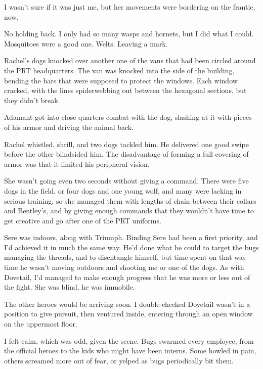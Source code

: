I wasn't sure if it was just me, but her movements were bordering on the frantic, now.



No holding back.  I only had so many wasps and hornets, but I did what I could.  Mosquitoes were a good one.  Welts.  Leaving a mark.



Rachel's dogs knocked over another one of the vans that had been circled around the PRT headquarters. The van was knocked into the side of the building, bending the bars that were supposed to protect the windows.  Each window cracked, with the lines spiderwebbing out between the hexagonal sections, but they didn't break.



Adamant got into close quarters combat with the dog, slashing at it with pieces of his armor and driving the animal back.



Rachel whistled, shrill, and two dogs tackled him.  He delivered one good swipe before the other blindsided him.  The disadvantage of forming a full covering of armor was that it limited his peripheral vision.



She wasn't going even two seconds without giving a command.  There were five dogs in the field, or four dogs and one young wolf, and many were lacking in serious training, so she managed them with lengths of chain between their collars and Bentley's, and by giving enough commands that they wouldn't have time to get creative and go after one of the PRT uniforms.



Sere was indoors, along with Triumph.  Binding Sere had been a first priority, and I'd achieved it in much the same way.  He'd done what he could to target the bugs managing the threads, and to disentangle himself, but time spent on that was time he wasn't moving outdoors and shooting me or one of the dogs.  As with Dovetail, I'd managed to make enough progress that he was more or less out of the fight.  She was blind, he was immobile.



The other heroes would be arriving soon.  I double-checked Dovetail wasn't in a position to give pursuit, then ventured inside, entering through an open window on the uppermost floor.



I felt calm, which was odd, given the scene.  Bugs swarmed every employee, from the official heroes to the kids who might have been interns.  Some howled in pain, others screamed more out of fear, or yelped as bugs periodically bit them.



